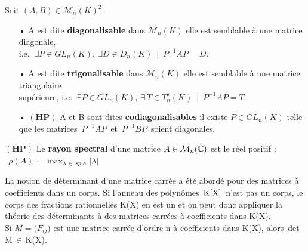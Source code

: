 \vspace{1.4cm}

Soit \((A,B)\in \mathcal{M}_n(K)^2\).\vspace{-0.1cm}
\begin{itemize}[leftmargin=0.5cm]
    \item[•] A est dite \textbf{diagonalisable} dans \(\mathcal{M}_n(K)\) \ssi elle est semblable à une matrice diagonale,\vspace{0.1cm}\\
    i.e. \(\ \exists P \in GL_n(K),\ \exists D\in D_n(K) \ \mid \ P^{-1}AP=D.\)\vspace{0.1cm}

    \item[•] A est dite \textbf{trigonalisable} dans \(\mathcal{M}_n(K)\) \ssi elle est semblable à une matrice triangulaire\vspace{0.1cm}\\
    supérieure, i.e. \(\ \exists P \in GL_n(K),\ \exists\, T\in T_n^s(K) \ \mid \ P^{-1}AP=T.\)\vspace{0.1cm}
    
    \item[•] \(\left(\mathbf{H} \mathbf{P} \right)\) A et B sont dites \textbf{codiagonalisables} \ssi il existe \(P\in GL_n(K)\) telle que les matrices \(\,P^{-1}AP\,\) et \(\,P^{-1}BP\,\) soient diagonales.
\end{itemize}

\vspace{1.3cm}

\(\left(\mathbf{H} \mathbf{P} \right)\) Le \textbf{rayon spectral} d'une matrice \(A\in \mathcal{M}_n(\mathbb{C})\) est le réel positif : \(\ \ \displaystyle \rho\left(A\right)=\max_{\lambda\,\in\, sp\, A}|\lambda |\,\).

\vspace{1.7cm}

\begin{small}
    La notion de déterminant d'une matrice carrée a été abordé pour des matrices à coefficients dans un corps. Si l'anneau des polynômes $\,\text{K}[\text{X}]\,$ n'est pas un corps, le corps des fractions rationnelles K(X) en est un et on peut donc appliquer la théorie des déterminants à des matrices carrées à coefficients dans K(X).\\
    Si \(M=\bigl(F_{ij}\bigr)\) est une matrice carrée d'ordre n à coefficients dans K(X), alors\, det\,M\(\,\in\,\)K(X).
\end{small}

